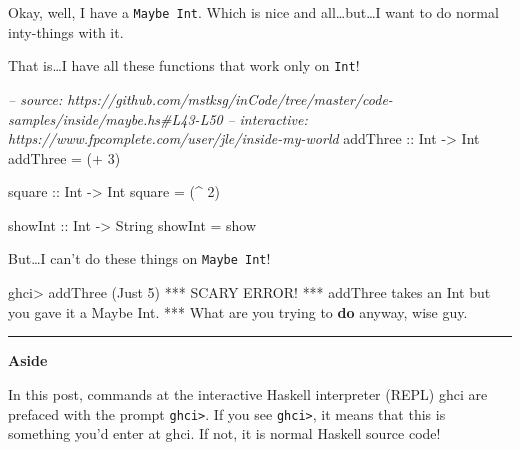 \documentclass[]{article}
\newenvironment{Shaded}{}{}
\newcommand{\KeywordTok}[1]{\textcolor[rgb]{0.00,0.44,0.13}{\textbf{#1}}}
\newcommand{\DataTypeTok}[1]{\textcolor[rgb]{0.56,0.13,0.00}{#1}}
\newcommand{\DecValTok}[1]{\textcolor[rgb]{0.25,0.63,0.44}{#1}}
\newcommand{\CommentTok}[1]{\textcolor[rgb]{0.38,0.63,0.69}{\textit{#1}}}
\newcommand{\OtherTok}[1]{\textcolor[rgb]{0.00,0.44,0.13}{#1}}
\newcommand{\FunctionTok}[1]{\textcolor[rgb]{0.02,0.16,0.49}{#1}}
\newcommand{\NormalTok}[1]{#1}
\begin{document}
Okay, well, I have a \texttt{Maybe\ Int}. Which is nice and
all\ldots{}but\ldots{}I want to do normal inty-things with it.

That is\ldots{}I have all these functions that work only on \texttt{Int}!

\begin{Shaded}
\begin{Highlighting}[]
\CommentTok{-- source: https://github.com/mstksg/inCode/tree/master/code-samples/inside/maybe.hs#L43-L50}
\CommentTok{-- interactive: https://www.fpcomplete.com/user/jle/inside-my-world}
\OtherTok{addThree ::} \DataTypeTok{Int} \OtherTok{->} \DataTypeTok{Int}
\NormalTok{addThree }\FunctionTok{=}\NormalTok{ (}\FunctionTok{+} \DecValTok{3}\NormalTok{)}

\OtherTok{square ::} \DataTypeTok{Int} \OtherTok{->} \DataTypeTok{Int}
\NormalTok{square }\FunctionTok{=}\NormalTok{ (}\FunctionTok{^} \DecValTok{2}\NormalTok{)}

\NormalTok{showInt}\OtherTok{ ::} \DataTypeTok{Int} \OtherTok{->} \DataTypeTok{String}
\NormalTok{showInt }\FunctionTok{=}\NormalTok{ show}
\end{Highlighting}
\end{Shaded}

But\ldots{}I can't do these things on \texttt{Maybe\ Int}!

\begin{Shaded}
\begin{Highlighting}[]
\NormalTok{ghci}\FunctionTok{>}\NormalTok{ addThree (}\DataTypeTok{Just} \DecValTok{5}\NormalTok{)}
\FunctionTok{***} \DataTypeTok{SCARY} \DataTypeTok{ERROR}\FunctionTok{!}
\FunctionTok{***}\NormalTok{ addThree takes an }\DataTypeTok{Int}\NormalTok{ but you gave it a }\DataTypeTok{Maybe} \DataTypeTok{Int}\FunctionTok{.}
\FunctionTok{***} \DataTypeTok{What}\NormalTok{ are you trying to }\KeywordTok{do}\NormalTok{ anyway, wise guy}\FunctionTok{.}
\end{Highlighting}
\end{Shaded}

\begin{center}\rule{0.5\linewidth}{\linethickness}\end{center}

\textbf{Aside}

In this post, commands at the interactive Haskell interpreter (REPL) ghci are
prefaced with the prompt \texttt{ghci\textgreater{}}. If you see
\texttt{ghci\textgreater{}}, it means that this is something you'd enter at
ghci. If not, it is normal Haskell source code!
\end{document}
